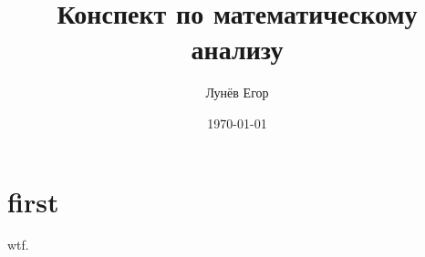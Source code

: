 \documentclass[12pt]{article}
\date{\today}
\author{Лунёв Егор}
\title{Конспект по математическому анализу}
\theoremstyle{plain}
\theoremstyle{definition}
\begin{document}
\maketitle
\tableofcontents
\pagebreak
\section{first}
wtf.
\end{document}
